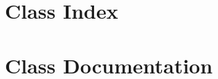 
\newcommand\tab[1][1cm]{\hspace*{#1}}

\chapter{Class Index}

\chapter{Class Documentation}
%





%





